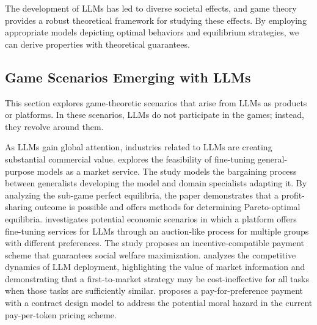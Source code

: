 The development of LLMs has led to diverse societal effects, and game theory provides a robust theoretical framework for studying these effects. By employing appropriate models depicting optimal behaviors and equilibrium strategies, we can derive properties with theoretical guarantees.

\subsection{Game Scenarios Emerging with LLMs}\label{secsub:game_emerging_with_llm}
This section explores game-theoretic scenarios that arise from LLMs as products or platforms. In these scenarios, LLMs do not participate in the games; instead, they revolve around them. 

As LLMs gain global attention, industries related to LLMs are creating substantial commercial value. 
\cite{laufer2024fine} explores the feasibility of fine-tuning general-purpose models as a market service. The study models the bargaining process between generalists developing the model and domain specialists adapting it. By analyzing the sub-game perfect equilibria, the paper demonstrates that a profit-sharing outcome is possible and offers methods for determining Pareto-optimal equilibria.
\cite{sun2024mechanism} investigates potential economic scenarios in which a platform offers fine-tuning services for LLMs through an auction-like process for multiple groups with different preferences. The study proposes an incentive-compatible payment scheme that guarantees social welfare maximization. 
\cite{mahmoodpricing} analyzes the competitive dynamics of LLM deployment, highlighting the value of market information and demonstrating that a first-to-market strategy may be cost-ineffective for all tasks when those tasks are sufficiently similar. 
\cite{saig2024incentivizing} proposes a pay-for-preference payment with a contract design model to address the potential moral hazard in the current pay-per-token pricing scheme.

